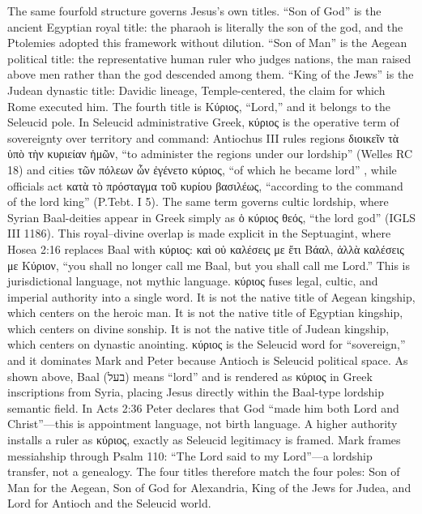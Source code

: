 The same fourfold structure governs Jesus's own titles.
``Son of God'' is the ancient Egyptian royal title: the pharaoh is literally the son of the god, and the Ptolemies adopted this framework without dilution.
``Son of Man'' is the Aegean political title: the representative human ruler who judges nations, the man raised above men rather than the god descended among them.
``King of the Jews'' is the Judean dynastic title: Davidic lineage, Temple-centered, the claim for which Rome executed him.
The fourth title is Κύριος, ``Lord,'' and it belongs to the Seleucid pole.
In Seleucid administrative Greek, κύριος is the operative term of sovereignty over territory and command: Antiochus III rules regions διοικεῖν τὰ ὑπὸ τὴν κυριείαν ἡμῶν, ``to administer the regions under our lordship'' (Welles RC 18) and cities τῶν πόλεων ὧν ἐγένετο κύριος, ``of which he became lord'' \cite[5.87.4]{polybius:histories}, while officials act κατὰ τὸ πρόσταγμα τοῦ κυρίου βασιλέως, ``according to the command of the lord king'' (P.Tebt. I 5).
The same term governs cultic lordship, where Syrian Baal-deities appear in Greek simply as ὁ κύριος θεός, ``the lord god'' (IGLS III 1186).
This royal--divine overlap is made explicit in the Septuagint, where Hosea 2:16 replaces Baal with κύριος: καὶ οὐ καλέσεις με ἔτι Βάαλ, ἀλλὰ καλέσεις με Κύριον, ``you shall no longer call me Baal, but you shall call me Lord.''
This is jurisdictional language, not mythic language.
κύριος fuses legal, cultic, and imperial authority into a single word.
It is not the native title of Aegean kingship, which centers on the heroic man.
It is not the native title of Egyptian kingship, which centers on divine sonship.
It is not the native title of Judean kingship, which centers on dynastic anointing.
κύριος is the Seleucid word for ``sovereign,'' and it dominates Mark and Peter because Antioch is Seleucid political space.
As shown above, Baal (בעל) means ``lord'' and is rendered as κύριος in Greek inscriptions from Syria, placing Jesus directly within the Baal-type lordship semantic field.
In Acts 2:36 Peter declares that God ``made him both Lord and Christ''---this is appointment language, not birth language.
A higher authority installs a ruler as κύριος, exactly as Seleucid legitimacy is framed.
Mark frames messiahship through Psalm 110: ``The Lord said to my Lord''---a lordship transfer, not a genealogy.
The four titles therefore match the four poles: Son of Man for the Aegean, Son of God for Alexandria, King of the Jews for Judea, and Lord for Antioch and the Seleucid world.

